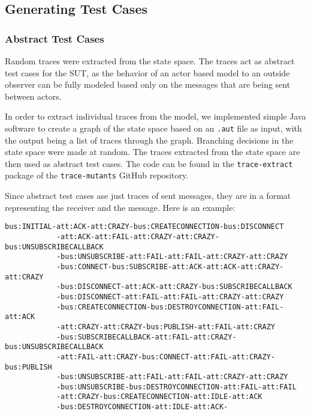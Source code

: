 \documentclass{article}
\begin{document}
		\subsection{Generating Test Cases}
			\label{sec:method_testgen}
			\subsubsection{Abstract Test Cases}
				\label{sec:method_abstract}
				Random traces were extracted from the state space. The traces act as abstract test cases for the SUT, as the behavior of an actor based model to an outside observer can be fully modeled based only on the messages that are being sent between actors.

				In order to extract individual traces from the \Rebeca model, we implemented simple Java software to create a graph of the state space based on an \texttt{.aut} file as input, with the output being a list of traces through the graph. Branching decisions in the state space were made at random. The traces extracted from the state space are then used as abstract test cases.
				The code can be found in the \texttt{trace-extract} package of the \texttt{trace-mutants} GitHub repository. \nocite{trace-mutants}

				Since abstract test cases ase just traces of sent messages, they are in a format representing the receiver and the message. Here is an example:
			\begin{lstlisting}[style=rebeca]
			bus:INITIAL-att:ACK-att:CRAZY-bus:CREATECONNECTION-bus:DISCONNECT
			-att:ACK-att:FAIL-att:CRAZY-att:CRAZY-bus:UNSUBSCRIBECALLBACK
			-bus:UNSUBSCRIBE-att:FAIL-att:FAIL-att:CRAZY-att:CRAZY
			-bus:CONNECT-bus:SUBSCRIBE-att:ACK-att:ACK-att:CRAZY-att:CRAZY
			-bus:DISCONNECT-att:ACK-att:CRAZY-bus:SUBSCRIBECALLBACK
			-bus:DISCONNECT-att:FAIL-att:FAIL-att:CRAZY-att:CRAZY
			-bus:CREATECONNECTION-bus:DESTROYCONNECTION-att:FAIL-att:ACK
			-att:CRAZY-att:CRAZY-bus:PUBLISH-att:FAIL-att:CRAZY
			-bus:SUBSCRIBECALLBACK-att:FAIL-att:CRAZY-bus:UNSUBSCRIBECALLBACK
			-att:FAIL-att:CRAZY-bus:CONNECT-att:FAIL-att:CRAZY-bus:PUBLISH
			-bus:UNSUBSCRIBE-att:FAIL-att:FAIL-att:CRAZY-att:CRAZY
			-bus:UNSUBSCRIBE-bus:DESTROYCONNECTION-att:FAIL-att:FAIL
			-att:CRAZY-bus:CREATECONNECTION-att:IDLE-att:ACK
			-bus:DESTROYCONNECTION-att:IDLE-att:ACK-\end{lstlisting}
\end{document}
